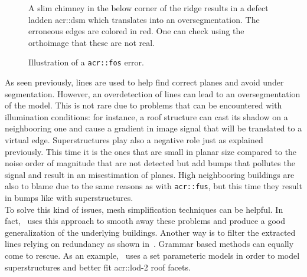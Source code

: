 \begin{figure}[htbp]
{\begin{subfloatrow}
{                                }{
                                    \caption{
                                        \label{subfig::fos_2d}
                                        A slim chimney in the below corner of the ridge results in a defect ladden \gls{acr::dsm} which translates into an oversegmentation.
                                        The erroneous edges are colored in red.
                                        One can check using the orthoimage that these are not real.
                                    }
                                }
                        \end{subfloatrow}
                    }{
                        \caption{
                            \label{fig::fos}
                            Illustration of a \texttt{\gls{acr::fos}} error.
                        }
                    }
                \end{figure}

                As seen previously, lines are used to help find correct planes and avoid under segmentation.
                However, an overdetection of lines can lead to an oversegmentation of the model.
                This is not rare due to problems that can be encountered with illumination conditions: for instance, a roof structure can cast its shadow on a neighbooring one and cause a gradient in image signal that will be translated to a virtual edge.
                Superstructures play also a negative role just as explained previously.
                This time it is the ones that are small in planar size compared to the noise order of magnitude that are not detected but add bumps that pollutes the signal and result in an misestimation of planes.
                High neighbooring buildings are also to blame due to the same reasons as with \texttt{\gls{acr::fus}}, but this time they result in bumps like with superstructures.\\

                To solve this kind of issues, mesh simplification techniques can be helpful.
                In fact,~\textcite{verdie2015lod} uses this approach to smooth away these problems and produce a good generalization of the underlying buildings.
                Another way is to filter the extracted lines relying on redundancy as shown in~\textcite{michelin2013quality}.
                Grammar based methods can equally come to rescue.
                As an example,~\textcite{bredif20073d} uses a set parameteric models in order to model superstructures and better fit \gls{acr::lod}-2 roof facets.

